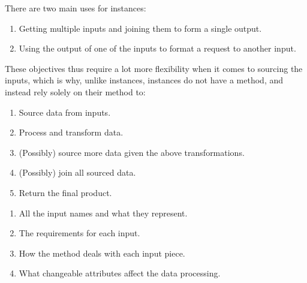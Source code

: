 \documentclass[letterpaper,10pt,english]{sphinxmanual}
\begin{document}
There are two main uses for  instances:
\begin{enumerate}
%
\item {} 
Getting multiple inputs and joining them to form a single output.

\item {} 
Using the output of one of the inputs to format a request to another input.

\end{enumerate}

These objectives thus require a lot more flexibility when it comes to sourcing the inputs, which is why, unlike  instances,  instances do not have a  method, and instead rely solely on their  method to:
\begin{enumerate}
%
\item {} 
Source data from inputs.

\item {} 
Process and transform data.

\item {} 
(Possibly) source more data given the above transformations.

\item {} 
(Possibly) join all sourced data.

\item {} 
Return the final product.

\end{enumerate}

\begin{enumerate}
%
\item {} 
All the input names and what they represent.

\item {} 
The requirements for each input.

\item {} 
How the  method deals with each input piece.

\item {} 
What changeable attributes affect the data processing.

\end{enumerate}
\end{document}
